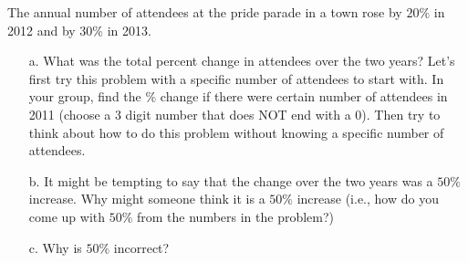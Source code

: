 \documentclass{ximera}
\begin{document}
\begin{exploration}
The annual number of attendees at the pride parade in a town rose by $20\%$ in 2012 and by $30\%$ in 2013.
\begin{itemize}
\item[a.] What was the total percent change in attendees over the two years?
Let's first try this problem with a specific number of attendees to start with.  In your group, find the $\%$ change if there were certain number of attendees in 2011 (choose a 3 digit number that does NOT end with a 0).  Then try to think about how to do this problem without knowing a specific number of attendees.
\item[b.] It might be tempting to say that the change over the two years was a $50\%$ increase.  Why might someone think it is a $50\%$ increase (i.e., how do you come up with $50\%$ from the numbers in the problem?)
\item[c.] Why is $50\%$ incorrect?
\end{itemize}
\end{exploration}
\end{document}

